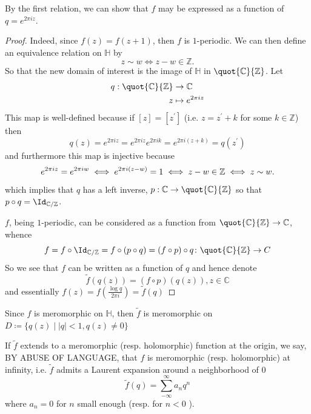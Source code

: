\documentclass[12pt]{article}
\theoremstyle{definition}
\begin{document}
By the first relation, we can show that \(f\) may be expressed as a function of \(q=e^{2 \pi i z}\). 
\begin{proof}
Indeed, since \(f(z)=f(z+1)\), then \(f\) is \(1\)-periodic. We can then define an equivalence relation on \(\mathbb{H}\) by
\[
    z \sim w \iff z - w \in \mathbb{Z}.
\]     
So that the new domain of interest is the image of \(\mathbb{H}\) in \(\quot{\mathbb{C} }{\mathbb{Z} } \). Let 
\begin{align*}
q: \quot{\mathbb{C} }{\mathbb{Z} } &\to \mathbb{C} \\
z &\mapsto e^{2\pi iz} 
\end{align*}
This map is well-defined because if \([z]=[z^{\prime} ]\) (i.e. \(z = z^{\prime} +k\) for some \(k \in \mathbb{Z} \)) then
\[
    q(z) = e^{2\pi  i z} = e^{2\pi i z}e^{2\pi i k} = e^{2\pi i(z+k)} = q(z^{\prime} )
\] 
and furthermore this map is injective because
\[
    e^{2 \pi i z} = e^{2\pi i w} \iff e^{2\pi i (z - w)} = 1 \iff z - w \in \Bbb{Z} \iff z \sim w.
\]
which implies that \(q\) has a left inverse, \(p: \mathbb{C} \to \quot{\mathbb{C} }{\mathbb{Z} } \) so that \(p\circ q = \Id_{ \mathbb{C} / \mathbb{Z} } \). 

\(f\), being \(1\)-periodic, can be considered as a function from \(\quot{\mathbb{C} }{\mathbb{Z} } \to \mathbb{C} \), whence
\[
    f = f \circ \Id_{\mathbb{C} /\mathbb{Z} } = f \circ (p \circ q) = (f \circ p) \circ q \colon \quot{\mathbb{C} }{\mathbb{Z} } \to  C 
\]
So we see that \(f\) can be written as a function of \(q\) and hence denote \[\widetilde{f}(q(z)) = (f \circ p)(q(z)), z\in \mathbb{C}  \]  
and essentially \(f(z) = f \left(\frac{\log q}{2\pi i}\right) = \widetilde{f} (q)\) 
\end{proof}  
Since \(f\) is meromorphic on \(\mathbb{H}\), then \(\widetilde{f} \) is meromorphic on \(D\coloneqq \{ q(z) \mid |q|<1, q(z) \ne 0\} \)

If \(\widetilde{f} \) extends to a meromorphic (resp. holomorphic) function at the origin, we say, BY ABUSE OF LANGUAGE, that \(f\) is meromorphic (resp. holomorphic) at infinity, i.e. \(\widetilde{f} \) admits a Laurent expansion around a neighborhood of \(0\)
\[
    \widetilde{f}(q) = \sum_{-\infty }^{\infty} a_{n}q^n   
\]    where \(a_n = 0 \) for \(n \) small enough (resp. for \(n<0\) ).
\end{document}
